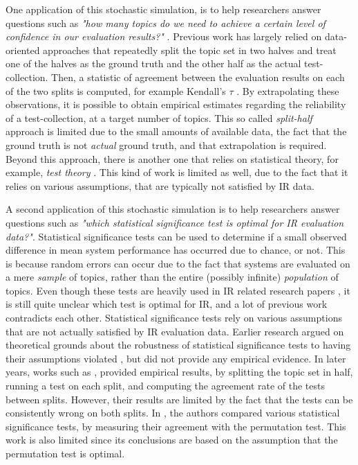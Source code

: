 One application of this stochastic simulation, is to help researchers answer questions such as \textit{"how many topics do we need to achieve a certain level of confidence in our evaluation results?"} \cite{Carterette2009, Urbano2016}. Previous work has largely relied on data-oriented approaches that repeatedly split the topic set in two halves and treat one of the halves as the ground truth and the other half as the actual test-collection. Then, a statistic of agreement between the evaluation results on each of the two splits is computed, for example Kendall's $\tau$ \cite{Zobel1998, Voorhees2002, Urbano2013a}. By extrapolating these observations, it is possible to obtain empirical estimates regarding the reliability of a test-collection, at a target number of topics. This so called \textit{split-half} approach is limited due to the small amounts of available data, the fact that the ground truth is not \textit{actual} ground truth, and that extrapolation is required. Beyond this approach, there is another one that relies on statistical theory, for example, \textit{test theory} \cite{Bodoff2007}. This kind of work is limited as well, due to the fact that it relies on various assumptions, that are typically not satisfied by IR data.

A second application of this stochastic simulation is to help researchers answer questions such as \textit{"which statistical significance test is optimal for IR evaluation data?"}. Statistical significance tests can be used to determine if a small observed difference in mean system performance has occurred due to chance, or not. This is because random errors can occur due to the fact that systems are evaluated on a mere \textit{sample} of topics, rather than the entire (possibly infinite) \textit{population} of topics. Even though these tests are heavily used in IR related research papers \cite{Sakai2016b, Carterette2017}, it is still quite unclear which test is optimal for IR, and a lot of previous work contradicts each other. Statistical significance tests rely on various assumptions that are not actually satisfied by IR evaluation data. Earlier research argued on theoretical grounds about the robustness of statistical significance tests to having their assumptions violated \cite{Rijsbergen1979, Hull1993}, but did not provide any empirical evidence. In later years, works such as \cite{Zobel1998, Sanderson2005, Urbano2013a}, provided empirical results, by splitting the topic set in half, running a test on each split, and computing the agreement rate of the tests between splits. However, their results are limited by the fact that the tests can be consistently wrong on both splits. In \cite{Smucker2007}, the authors compared various statistical significance tests, by measuring their agreement with the permutation test. This work is also limited since its conclusions are based on the assumption that the permutation test is optimal.

